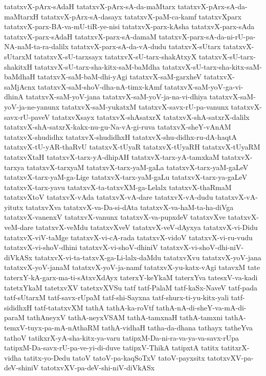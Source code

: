 {tatatxvX-pArx-sAdaH
tatatxvX-pArx-sA-da-maMtarx
tatatxvX-pArx-sA-da-maMtarxH
tatatxvX-pArx-sA-dasayx
tatatxvX-paM-ca-kamf
tatatxvXparx
tatatxvX-parx-BA-va-mU-tiR-ye-nisi
tatatxvX-parx-kAsha
tatatxvX-parx-sAda
tatatxvX-parx-sAdaH
tatatxvX-parx-sA-damaM
tatatxvX-parx-sA-da-ni-rU-pa-NA-naM-ta-ra-dalilx
tatatxvX-parx-sA-da-vA-dudu
tatatxvX-sUtarx
tatatxvX-sUtarxM
tatatxvX-sU-tarxsayx
tatatxvX-sU-tarx-shakAtxyX
tatatxvX-sU-tarx-shakitxH
tatatxvX-sU-tarx-sha-kitx-saM-baMdha
tatatxvX-sU-tarx-sha-kitx-saM-baMdhaH
tatatxvX-saM-baM-dhi-yAgi
tatatxvX-saM-garxheV
tatatxvX-saMjAcnx
tatatxvX-saM-shoV-dha-nA-timx-kAmf
tatatxvX-saM-yoV-ga-vi-dhinA
tatatxvX-saM-yoV-jana
tatatxvX-saM-yoV-ja-na-vi-dhiya
tatatxvX-saM-yoV-ja-ne-yanunx
tatatxvX-saM-yukatxM
tatatxvX-savx-rU-pa-vanunx
tatatxvX-savx-rU-paveV
tatatxvXsayx
tatatxvX-shAsatxrX
tatatxvX-shA-satxrX-dalilx
tatatxvX-shA-satxrX-kakx-nu-gu-Na-vA-gi-ruva
tatatxvX-sheY-vAnAM
tatatxvX-shudidhx
tatatxvX-shudidhxH
tatatxvX-shu-didhx-ru-dA-haqtA
tatatxvX-tU-yAR-thaRvU
tatatxvX-tUyaR
tatatxvX-tUyaRH
tatatxvX-tUyaRM
tatatxvXtaH
tatatxvX-tarx-yA-dhipAH
tatatxvX-tarx-yA-tamxkaM
tatatxvX-tarxya
tatatxvX-tarxyaM
tatatxvX-tarx-yaM-gaLa
tatatxvX-tarx-yaM-gaLeV
tatatxvX-tarx-yaM-ga-Lige
tatatxvX-tarx-yaM-gaLu
tatatxvX-tarx-ya-gaLeV
tatatxvX-tarx-yavu
tatatxvX-ta-tatxvXM-ga-Lelalx
tatatxvX-thaRmaM
tatatxvXtoV
tatatxvX-vAda
tatatxvX-vA-dare
tatatxvX-vA-dudu
tatatxvX-vA-yitutx
tatatxvXva
tatatxvX-va-Da-si-dAta
tatatxvX-va-haM-ta-ha-diVga
tatatxvX-vanenxV
tatatxvX-vanunx
tatatxvX-va-pupxdeV
tatatxvXve
tatatxvX-veM-dare
tatatxvX-veMdu
tatatxvXveV
tatatxvX-veV-dAyxya
tatatxvX-vi-Didu
tatatxvX-viV-taMge
tatatxvX-vi-cA-rada
tatatxvX-vidoV
tatatxvX-vi-ru-vudu
tatatxvX-vi-shoV-dhini
tatatxvX-vi-shoV-dhiniV
tatatxvX-vi-shoV-dhi-niV-diVkASx
tatatxvX-vi-ta-tatxvX-ga-Li-lalx-daMdu
tatatxvXvu
tatatxvX-yoV-jana
tatatxvX-yoV-janaM
tatatxvX-yoV-ja-namf
tatatxvX-yu-katx-vAgi
tatavxM
tate
taterxY-kA-garx-ma-ti-sAtxvXdAyx
taterxY-keYkaM
taterxYva
tatesxV-va-kadi
tatetxYkaM
tatetxvXV
tatetxvXVSu
tatf
tatf-PalaM
tatf-kaSx-NaveV
tatf-pada
tatf-sUtarxM
tatf-savx-rUpaM
tatf-shi-Sayxna
tatf-shurx-ti-yu-kitx-yali
tatf-sididhxH
tatf-tatatxvXM
tathA
tathA-ka-roVtf
tathA-nA-di-sheY-va-mA-di-paraM
tathAneyxV
tathA-neyxVSAM
tathA-tamxnaH
tathA-tamxni
tathA-temxV-tuyx-pa-mA-nAthaRM
tathA-vidhaH
tatha-da-dhana
tathayx
tatheYva
tathoV
tatikxrX-yA-sha-kitx-ya-varu
tatipxM-Da-ni-ra-va-ya-va-savx-rUpa
tatipxM-Da-savx-rU-pa-ve-yi-di-duve
tatipxV-ThikA
tatipxtA
tatitx
tatitxrX-vidha
tatitx-yo-Dedu
tatoV
tatoV-pa-kaqSoTxV
tatoV-payxsitx
tatotxvXV-pa-deV-shiniV
tatotxvXV-pa-deV-shi-niV-diVkASx
}
